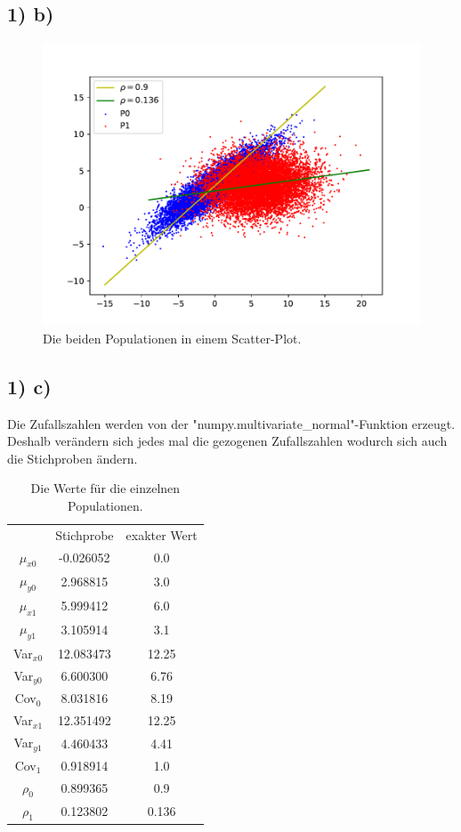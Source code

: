 \subsection*{1) b)}
\begin{figure}[H]
  \includegraphics[width=\linewidth]{Python/Aufgabe1b.pdf}
  \caption{Die beiden Populationen in einem Scatter-Plot.}
\end{figure}


\subsection*{1) c)}
Die Zufallszahlen werden von der "numpy.multivariate\_normal"-Funktion erzeugt. Deshalb verändern sich jedes mal die gezogenen Zufallszahlen wodurch sich auch die Stichproben ändern.
\begin{table}[H]
  \centering
  \begin{tabular}{c c c}
    & Stichprobe & exakter Wert \\
    $\mu_{x0}$ & -0.026052 & 0.0 \\
    $\mu_{y0}$ & 2.968815 & 3.0 \\
    $\mu_{x1}$ & 5.999412 & 6.0 \\
    $\mu_{y1}$ & 3.105914 & 3.1 \\
    Var$_{x0}$ & 12.083473 & 12.25\\
    Var$_{y0}$ & 6.600300 & 6.76 \\
    Cov$_0$ & 8.031816 & 8.19 \\
    Var$_{x1}$ & 12.351492 & 12.25 \\
    Var$_{y1}$ & 4.460433 & 4.41 \\
    Cov$_1$ & 0.918914 & 1.0 \\
    $\rho_0$ & 0.899365 & 0.9 \\
    $\rho_1$ & 0.123802 & 0.136 \\
  \end{tabular}
  \caption{Die Werte für die einzelnen Populationen.}
\end{table}

